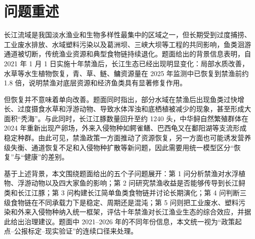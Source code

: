 
\section{问题重述}
长江流域是我国淡水渔业和生物多样性最集中的区域之一，但长期受到过度捕捞、工业废水排放、水域塑料污染以及葛洲坝、三峡大坝等工程的共同影响，鱼类洄游通道被切断，传统渔业资源和典型食物链持续退化。题面给出的背景信息表明，自 2021 年 1 月 1 日实施十年禁渔后，长江生态已经出现明显变化：局部水质改善，水草等水生植物恢复，青、草、鲢、鳙资源量在 2025 年监测中已恢复到禁渔前约 1.8 倍，说明禁渔对底层资源和经济鱼类具有显著修复作用。

但恢复并不意味着单向改善。题面同时指出，部分水域在禁渔后出现鱼类过快增长、过度摄食水草和浮游动物、导致水体浑浊和底栖植被减少的现象，甚至形成大面积“秃海”。与此同时，长江江豚数量回升至约 1240 头，中华鲟自然繁殖群体在 2024 年重新出现产卵场，外来入侵物种如鳄雀鳝、巴西龟又在鄱阳湖等支流形成稳定种群。由此可见，禁渔政策一方面推动了资源恢复，另一方面也可能诱发营养级失衡、通道恢复不足和入侵物种扩散等新问题，因此需要用统一模型区分“恢复”与“健康”的差别\cite{report2022,report2023}。

基于上述背景，本文围绕题面给出的五个子问题展开：第 1 问分析禁渔对水浮植物、浮游动物以及四大家鱼的影响；第 2 问研究禁渔收益是否能够传导到长江鲟类和长江江豚；第 3 问构建长江简单鱼类食物链并讨论长期演化；第 4 问判断三级食物链在不同承载力下是稳定、周期还是混沌；第 5 问则把工业废水、塑料污染和外来入侵物种纳入统一框架，评估十年禁渔对长江渔业生态的综合效应，并据此给出治理建议。题面中 2021--2026 年的不同年份信息，本文统一视为“政策起点--公报标定--现实验证”的连续口径来处理\cite{yangtzeA}。
